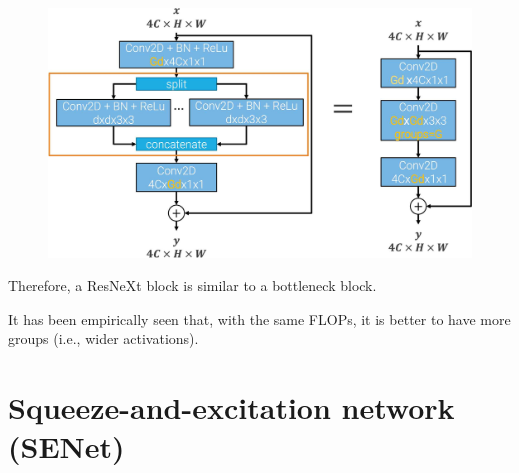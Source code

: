 \begin{description}
\begin{description}
\begin{descriptionlist}
                        \begin{figure}[H]
                            \centering
                            \includegraphics[width=0.6\linewidth]{./img/_resnext_to_resnet_l2.jpg}
                        \end{figure}
                \end{descriptionlist}

            \begin{remark}
                Therefore, a ResNeXt block is similar to a bottleneck block.
            \end{remark}
        \end{description}
\end{description}

\begin{remark}
    It has been empirically seen that, with the same FLOPs, it is better to have more groups (i.e., wider activations).
\end{remark}



\section{Squeeze-and-excitation network (SENet)}

